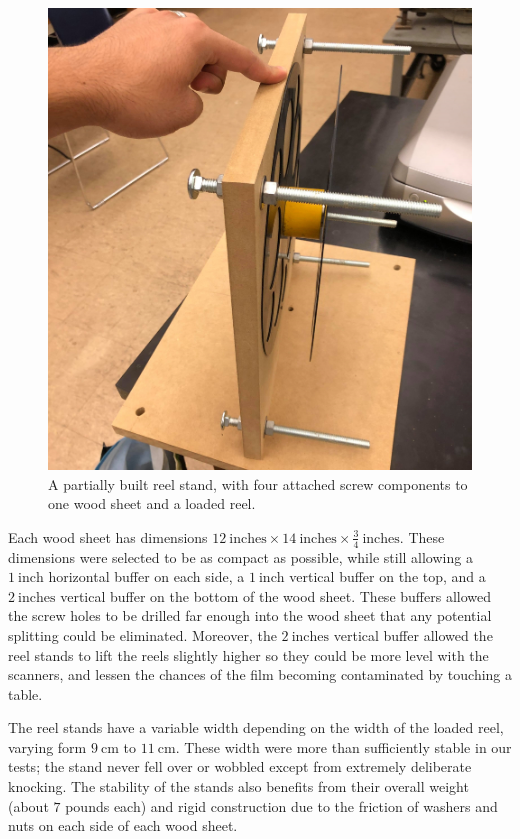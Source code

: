 \documentclass[12pt]{article} %
\begin{document}
\begin{figure}[H]
    \centering
    \includegraphics[width=0.7\linewidth]{Images/Reel stand images/reelstadnscrewsandreel.jpg}
    \caption{A partially built reel stand, with four attached screw components to one wood sheet and a loaded reel.}
    \label{fig: reelstandscrewsandreel}
\end{figure}

Each wood sheet has dimensions $12 \ \text{inches} \times 14 \ \text{inches} \times \frac{3}{4} \ \text{inches}$. These dimensions were selected to be as compact as possible, while still allowing a $1 \ \text{inch}$ horizontal buffer on each side, a $1 \ \text{inch}$ vertical buffer on the top, and a $2 \ \text{inches}$ vertical buffer on the bottom of the wood sheet. These buffers allowed the screw holes to be drilled far enough into the wood sheet that any potential splitting could be eliminated. Moreover, the $2 \ \text{inches}$ vertical buffer allowed the reel stands to lift the reels slightly higher so they could be more level with the scanners, and lessen the chances of the film becoming contaminated by touching a table.

The reel stands have a variable width depending on the width of the loaded reel, varying form $9 \ \text{cm}$ to $11 \ \text{cm}$. These width were more than sufficiently stable in our tests; the stand never fell over or wobbled except from extremely deliberate knocking. The stability of the stands also benefits from their overall weight (about $7$ pounds each) and rigid construction due to the friction of washers and nuts on each side of each wood sheet.
\end{document}
